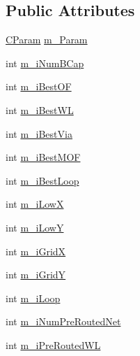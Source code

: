 \subsection*{Public Attributes}
\begin{DoxyCompactItemize}
\item 
\mbox{\hyperlink{classCParam}{C\+Param}} \mbox{\hyperlink{classCDesign_a489d3618699827b5e627a664f2f7d5f5}{m\+\_\+\+Param}}
\item 
int \mbox{\hyperlink{classCDesign_a74e65d9fd11c4a039befff9d8e41b01d}{m\+\_\+i\+Num\+B\+Cap}}
\item 
int \mbox{\hyperlink{classCDesign_ab1c2cde9f96bb133aa87519650e45bce}{m\+\_\+i\+Best\+OF}}
\item 
int \mbox{\hyperlink{classCDesign_aa2e160d691c0b14d8cc87082241bc72f}{m\+\_\+i\+Best\+WL}}
\item 
int \mbox{\hyperlink{classCDesign_a63f7490b8edc70d0fce2658acbbeb777}{m\+\_\+i\+Best\+Via}}
\item 
int \mbox{\hyperlink{classCDesign_a6bfd1ebd78092c33333828bf515a87fc}{m\+\_\+i\+Best\+M\+OF}}
\item 
int \mbox{\hyperlink{classCDesign_ab28a7a221cb19327d59269dfcf5483e9}{m\+\_\+i\+Best\+Loop}}
\item 
int \mbox{\hyperlink{classCDesign_a5bea929e13e38c200d2034651457a27e}{m\+\_\+i\+LowX}}
\item 
int \mbox{\hyperlink{classCDesign_ab15ef3272b9a059506bbd5adc0f7ef0c}{m\+\_\+i\+LowY}}
\item 
int \mbox{\hyperlink{classCDesign_a1f90694498252121b0cf678a5026004d}{m\+\_\+i\+GridX}}
\item 
int \mbox{\hyperlink{classCDesign_a30145716f1b1f9150985e1fda92d6241}{m\+\_\+i\+GridY}}
\item 
int \mbox{\hyperlink{classCDesign_a302a56631b844951a559379c91f4f131}{m\+\_\+i\+Loop}}
\item 
int \mbox{\hyperlink{classCDesign_a49b0509865376bfa3288521a01a765c1}{m\+\_\+i\+Num\+Pre\+Routed\+Net}}
\item 
int \mbox{\hyperlink{classCDesign_a0f8b3a9f0579f6dcefd066d4ee4e050d}{m\+\_\+i\+Pre\+Routed\+WL}}
\end{DoxyCompactItemize}

